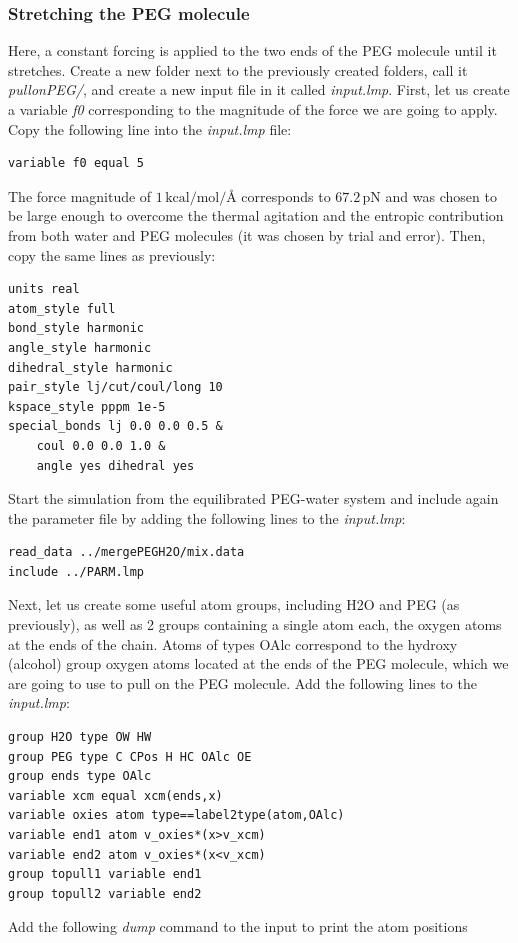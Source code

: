 \documentclass[9pt,tutorial]{livecoms}
\begin{document}
\subsubsection{Stretching the PEG molecule}
Here, a constant forcing is applied to the two ends of the PEG molecule until it
stretches. Create a new folder next to the previously created folders, call it
\textit{pullonPEG/}, and create a new input file in it called \textit{input.lmp}.
First, let us create a variable \textit{f0} corresponding to the magnitude of the
force we are going to apply. Copy the following line into the \textit{input.lmp} file:
{\normalsize \begin{verbatim}
variable f0 equal 5
\end{verbatim}}
The force magnitude of $1\,\text{kcal/mol/\AA{}}$ corresponds to $67.2\,\text{pN}$
and was chosen to be large enough to overcome the thermal agitation and the entropic
contribution from both water and PEG molecules (it was chosen by trial and error).
Then, copy the same lines as previously:
{\normalsize \begin{verbatim}
units real
atom_style full
bond_style harmonic
angle_style harmonic
dihedral_style harmonic
pair_style lj/cut/coul/long 10
kspace_style pppm 1e-5
special_bonds lj 0.0 0.0 0.5 &
    coul 0.0 0.0 1.0 &
    angle yes dihedral yes
\end{verbatim}}
Start the simulation from the equilibrated PEG-water system and include again the
parameter file by adding the following lines to the \textit{input.lmp}:
{\normalsize \begin{verbatim}
read_data ../mergePEGH2O/mix.data
include ../PARM.lmp
\end{verbatim}}
Next, let us create some useful atom groups, including H2O and PEG (as previously),
as well as 2 groups containing a single atom each, the oxygen atoms at the ends
of the chain. Atoms of types OAlc correspond to the hydroxy (alcohol) group oxygen
atoms located at the ends of the PEG molecule, which we are going to use to pull
on the PEG molecule. Add the following lines to the \textit{input.lmp}:
{\normalsize \begin{verbatim}
group H2O type OW HW
group PEG type C CPos H HC OAlc OE
group ends type OAlc
variable xcm equal xcm(ends,x)
variable oxies atom type==label2type(atom,OAlc)
variable end1 atom v_oxies*(x>v_xcm)
variable end2 atom v_oxies*(x<v_xcm)
group topull1 variable end1
group topull2 variable end2
\end{verbatim}}
Add the following \textit{dump} command to the input to print the atom positions
\end{document}
